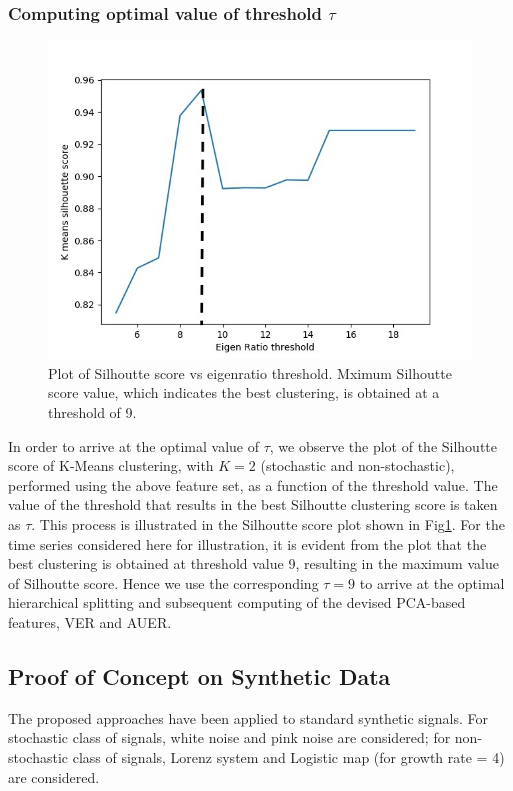 \documentclass[journal]{IEEEtran}
\begin{document}
	\subsubsection{ Computing optimal value of threshold $\tau$} \label{compute_threshold}

		\begin{figure}[ht]
		\centering
		\includegraphics[width=0.8\linewidth]{threshold_vs_silhoutte_score.jpg}
		\caption{Plot of Silhoutte score vs eigenratio threshold. Mximum Silhoutte score value, which indicates the best clustering, is obtained at a threshold of 9.}
		\label{sill}
	\end{figure}



	In order to arrive at the optimal value of $\tau$, we observe  the plot of the Silhoutte score of K-Means clustering, with $K=2$ (stochastic and non-stochastic), performed using the above feature set, as a function of the threshold value. The value of the threshold that results in the best Silhoutte clustering score is taken as $\tau$. This process is illustrated in the Silhoutte score plot shown in Fig\ref{sill}. For the time series considered here for illustration, it is evident from the plot that the best clustering is obtained at threshold value 9, resulting in the maximum value of Silhoutte score. Hence we use the corresponding $\tau = 9$ to arrive at the optimal hierarchical splitting and subsequent computing of the devised PCA-based features, VER and AUER.

	\subsection{Proof of Concept on Synthetic Data}
	The proposed approaches have been applied to standard synthetic signals. For stochastic class of signals, white noise and pink noise are considered; for non-stochastic class of signals, Lorenz system and Logistic map (for growth rate = 4) are considered.
	
\end{document}
